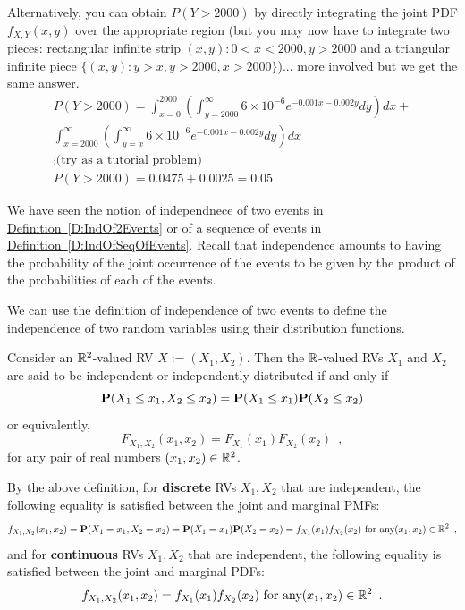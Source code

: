 \begin{example}
{\scriptsize
Alternatively, you can obtain $P(Y>2000)$ by directly integrating the joint PDF $f_{X,Y}(x,y)$ over the appropriate region (but you may now have to integrate two pieces: rectangular infinite strip ${(x,y): 0<x<2000, y>2000}$ and a triangular infinite piece $\{(x,y): y>x, y>2000, x> 2000\}$)... more involved but we get the same answer.
\begin{multline*}
P(Y>2000) = \int_{x=0}^{2000} \left( \int_{y=2000}^{\infty} 6 \times 10^{-6} e^{-0.001 x - 0.002y} dy \right) dx + \\
\int_{x=2000}^{\infty} \left( \int_{y=x}^{\infty} 6 \times 10^{-6} e^{-0.001 x - 0.002y} dy \right) dx 
\\
\vdots \text{(try as a tutorial problem)} \\
P(Y>2000) = 0.0475 + 0.0025 = 0.05
\end{multline*}
}
\end{example}

We have seen the notion of independnece of two events in \hyperref[D:IndOf2Events]{Definition~\ref*{D:IndOf2Events}} or of a sequence of events in \hyperref[D:IndOfSeqOfEvents]{Definition~\ref*{D:IndOfSeqOfEvents}}. 
Recall that independence amounts to having the probability of the joint occurrence of the events to be given by the product of the probabilities of each of the events.

We can use the definition of independence of two events to define the independence of two random variables using their distribution functions.

\begin{definition}\label{D:Ind2RVs}
Consider an $\mathbb{R}^2$-valued RV $X:=(X_1,X_2)$. Then the $\mathbb{R}$-valued RVs $X_1$ and $X_2$ are said to be independent or independently distributed if and only if
\[
\mathbf{P}(X_{1} \leq x_{1}, X_{2} \leq x_{2} ) = \mathbf{P}(X_{1} \leq x_{1}) \mathbf{P}(X_{2} \leq x_{2})
\]
or equivalently,
\[
F_{X_{1},X_{2}}(x_{1},x_{2}) = F_{X_{1}}(x_{1}) F_{X_{2}}(x_{2}) \enspace ,
\]
for any pair of real numbers $(x_{1},x_{2}) \in \mathbb{R}^2$.

By the above definition, for {\bf discrete} RVs $X_1,X_2$ that are independent, the following equality is satisfied between the joint and marginal PMFs:
\[
f_{X_1,X_2}(x_1,x_2) = \mathbf{P}(X_{1}= x_{1}, X_{2} = x_{2}) = \mathbf{P}(X_{1} = x_{1}) \mathbf{P}(X_{2} = x_{2}) = f_{X_1}(x_1) f_{X_2}(x_2) \text{ for any} (x_{1},x_{2}) \in \mathbb{R}^2 \enspace ,
\]
and for {\bf continuous} RVs $X_1,X_2$ that are independent, the following equality is satisfied between the joint and marginal PDFs:
\[
f_{X_1,X_2}(x_1,x_2) = f_{X_1}(x_1) f_{X_2}(x_2)  \text{ for any} (x_{1},x_{2}) \in \mathbb{R}^2 \enspace .
\] 
\end{definition}

